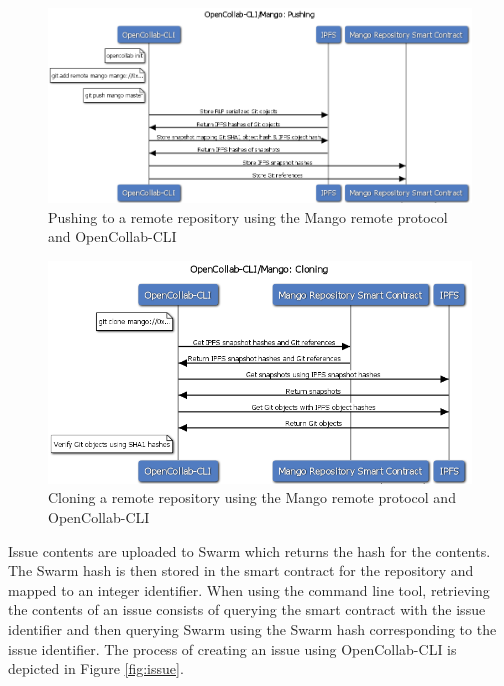 \begin{figure}[]
  \centering
  \includegraphics[width=\linewidth,keepaspectratio]{figures/OpenCollab-CLI-Mango-Pushing.png}
  \caption{Pushing to a remote repository using the Mango remote protocol and OpenCollab-CLI}
  \label{fig:push}

\end{figure}

\begin{figure}[]
  \centering
  \includegraphics[width=\linewidth,keepaspectratio]{figures/OpenCollab-CLI-Mango-Cloning.png}
  \caption{Cloning a remote repository using the Mango remote protocol and OpenCollab-CLI}
  \label{fig:clone}
\end{figure}

Issue contents are uploaded to Swarm which returns the hash for the contents.
The Swarm hash is then stored in the smart contract for the repository and
mapped to an integer identifier. When using the command line tool, retrieving the contents of an issue consists of
querying the smart contract with the issue identifier and then querying Swarm
using the Swarm hash corresponding to the issue identifier. The process of
creating an issue using OpenCollab-CLI is depicted in Figure \ref{fig:issue}.

